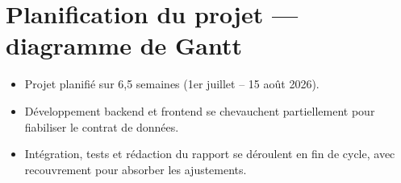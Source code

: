 \documentclass[12pt,a4paper]{article}
\newcommand{\forcereset}[1]{%
    \needspace{#1\baselineskip}%
}
\begin{document}
\newpage

\section{Planification du projet --- diagramme de Gantt}
\forcereset{6}

\begin{itemize}[leftmargin=1.2cm, itemsep=0.2\baselineskip]
    \item Projet planifié sur 6,5 semaines (1er juillet – 15 août 2026).
    \item Développement backend et frontend se chevauchent partiellement pour fiabiliser le contrat de données.
    \item Intégration, tests et rédaction du rapport se déroulent en fin de cycle, avec recouvrement pour absorber les ajustements.
\end{itemize}
\end{document}
